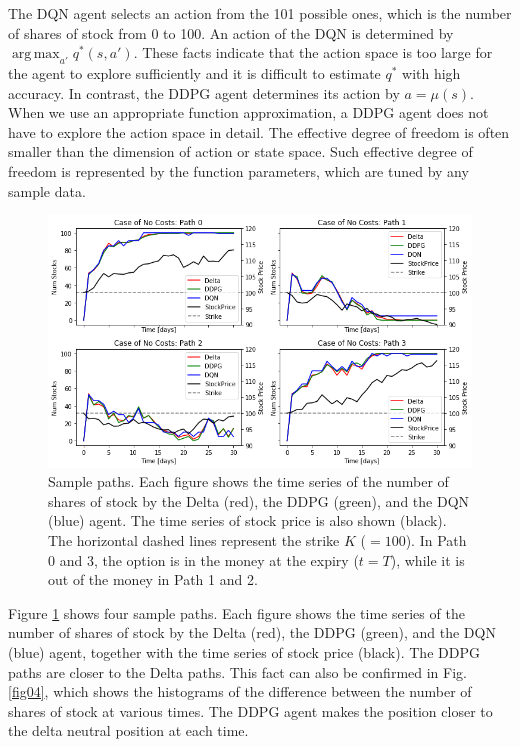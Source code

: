 \documentclass[11pt]{article}
\DeclareMathOperator*{\argmax}{arg\,max}
\begin{document}
The DQN agent selects an action from the 101 possible ones, which is the number of shares of stock from 0 to 100. An action of the DQN is determined by $\argmax_{a'} q^\ast(s, a')$. These facts indicate that the action space is too large for the agent to explore sufficiently and it is difficult to estimate $q^\ast$ with high accuracy. In contrast, the DDPG agent determines its action by $a = \mu(s)$. When we use an appropriate function approximation, a DDPG agent does not have to explore the action space in detail. The effective degree of freedom is often smaller than the dimension of action or state space. Such effective degree of freedom is represented by the function parameters, which are tuned by any sample data.

\begin{figure}[htb]
	\begin{center}
		\includegraphics[width=15cm]{../fig/fig03.png}
		\caption{Sample paths. Each figure shows the time series of the number of shares of stock by the Delta (red), the DDPG (green), and the DQN (blue) agent. The time series of stock price is also shown (black). The horizontal dashed lines represent the strike $K$ ($= 100$). In Path 0 and 3, the option is in the money at the expiry ($t=T$), while it is out of the money in Path 1 and 2.}
		\label{fig03}
	\end{center}
\end{figure}

Figure \ref{fig03} shows four sample paths. Each figure shows the time series of the number of shares of stock by the Delta (red), the DDPG (green), and the DQN (blue) agent, together with the time series of stock price (black). The DDPG paths are closer to the Delta paths. This fact can also be confirmed in Fig. \ref{fig04}, which shows the histograms of the difference between the number of shares of stock at various times. The DDPG agent makes the position closer to the delta neutral position at each time. 
\end{document}
